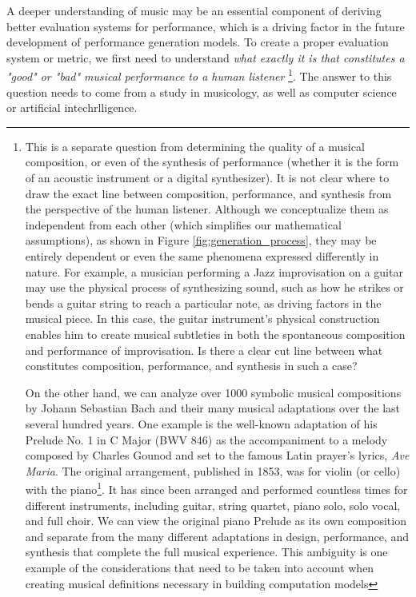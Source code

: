 A deeper understanding of music may be an essential component of deriving better evaluation systems for performance, which is a driving factor in the future development of performance generation models. To create a proper evaluation system or metric, we first need to understand \emph{what exactly it is that constitutes a "good" or "bad" musical performance to a human listener}%
\footnote{This is a separate question from determining the quality of a musical composition, or even of the synthesis of performance (whether it is the form of an acoustic instrument or a digital synthesizer). It is not clear where to draw the exact line between composition, performance, and synthesis from the perspective of the human listener. Although we conceptualize them as independent from each other (which simplifies our mathematical assumptions), as shown in Figure \ref{fig:generation_process}, they may be entirely dependent or even the same phenomena expressed differently in nature. For example, a musician performing a Jazz improvisation on a guitar may use the physical process of synthesizing sound, such as how he strikes or bends a guitar string to reach a particular note, as driving factors in the musical piece. In this case, the guitar instrument's physical construction enables him to create musical subtleties in both the spontaneous composition and performance of improvisation. Is there a clear cut line between what constitutes composition, performance, and synthesis in such a case?

On the other hand, we can analyze over 1000 symbolic musical compositions by Johann Sebastian Bach and their many musical adaptations over the last several hundred years. One example is the well-known adaptation of his Prelude No. 1 in C Major (BWV 846) as the accompaniment to a melody composed by Charles Gounod and set to the famous Latin prayer's lyrics, \emph{Ave Maria}. The original arrangement, published in 1853, was for violin (or cello) with the piano\footnote{For an example performance, look \href{https://www.youtube.com/watch?v=hyUhEjtlDLA&ab_channel=YoYoMaVEVO}{here} for a recent performance by the well-known cellist, Yo-Yo Ma}. It has since been arranged and performed countless times for different instruments, including guitar, string quartet, piano solo, solo vocal, and full choir. We can view the original piano Prelude as its own composition and separate from the many different adaptations in design, performance, and synthesis that complete the full musical experience. This ambiguity is one example of the considerations that need to be taken into account when creating musical definitions necessary in building computation models}. The answer to this question needs to come from a study in musicology, as well as computer science or artificial intechrlligence. 

